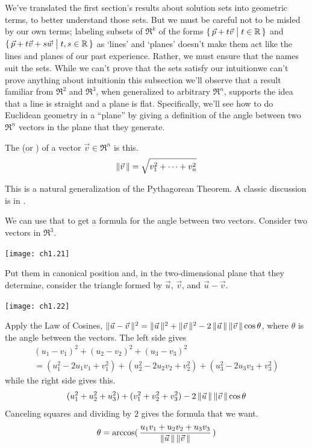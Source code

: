 We've translated the first section's results about solution sets into
geometric terms, to better understand those sets.
But we must be careful not to be misled by our own terms; labeling subsets of
\( \Re^k \) of the forms
\( \mbox{$\{\,\vec{p}+t\vec{v}\bigm| t\in\mathbb{R}\,\}$} \) and
\( \mbox{$\{\,\vec{p}+t\vec{v}+s\vec{w}\bigm| t,s\in\mathbb{R}\,\}$} \)
as `lines' and `planes' doesn't make them act like the lines
and planes of our past experience.
Rather, we must ensure that the names suit the sets.
While we can't prove that the sets satisfy our intuition\Dash we can't
prove anything about intuition\Dash in this subsection we'll observe that
a result familiar from \( \Re^2 \) and \( \Re^3 \), when generalized to
arbitrary \( \Re^n \), supports the idea that a line is straight
and a plane is flat.
Specifically, we'll see how to do Euclidean geometry in a ``plane'' by giving
a definition of the angle between two $\Re^n$ vectors in the plane that they
generate.

\begin{definition}
The  
(or )
of a vector
\( \vec{v}\in\Re^n \) is this.
\begin{equation*}
  \|\vec{v}\,\|=\sqrt{v_1^2+\cdots+v_n^2}
\end{equation*}
\end{definition}

\begin{remark}
This is a natural generalization of the Pythagorean Theorem.
A classic discussion is in \cite{MathematicsPlausReason}.
\end{remark}

We can use that to get a formula 
for the angle between two vectors.
Consider two vectors in \( \Re^3 \).
\begin{center}
  \texttt{[image: ch1.21]}
\end{center}
Put them in canonical position
and, in the two-dimensional 
plane that they determine, consider the triangle formed by
\( \vec{u} \), \( \vec{v} \), and \( \vec{u}-\vec{v} \).
\begin{center}
  \texttt{[image: ch1.22]}
\end{center}
Apply the Law of Cosines,
$\|\vec{u}-\vec{v}\,\|^2
  =
  \|\vec{u}\,\|^2+\|\vec{v}\,\|^2-
    2\,\|\vec{u}\,\|\,\|\vec{v}\,\|\cos\theta$, 
where \( \theta \) is the angle between the vectors.
The left side gives 
\begin{multline*}
(u_1-v_1)^2+(u_2-v_2)^2+(u_3-v_3)^2  \\
     =(u_1^2-2u_1v_1+v_1^2)+(u_2^2-2u_2v_2+v_2^2)+(u_3^2-2u_3v_3+v_3^2)
\end{multline*}
while the right side gives this.
\begin{equation*}
(u_1^2+u_2^2+u_3^2)+(v_1^2+v_2^2+v_3^2)-
     2\,\|\vec{u}\,\|\,\|\vec{v}\,\|\cos\theta
\end{equation*}
Canceling squares and dividing by $2$ gives 
the formula that we want.
\begin{equation*}
  \theta
  =
  \arccos(\,\frac{u_1v_1+u_2v_2+u_3v_3}{
         \|\vec{u}\,\|\,\|\vec{v}\,\| }\,)
\end{equation*}

